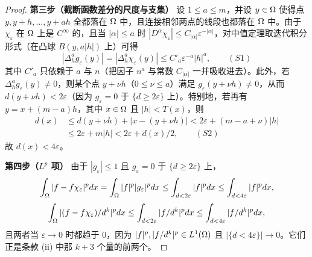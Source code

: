 \begin{proof}
\textbf{第三步（截断函数差分的尺度与支集）} 设 $1 \le a \le m$，并设 $y \in \Omega$ 使得点 $y, y+h, \dots, y+a h$ 全都落在 $\Omega$ 中，且连接相邻两点的线段也都落在 $\Omega$ 中。由于 $\chi_\varepsilon$ 在 $\Omega$ 上是 $C^\infty$ 的，且当 $|\alpha| \le a$ 时 $|D^\alpha \chi_\varepsilon| \le C_{|\alpha|} \varepsilon^{-|\alpha|}$，对中值定理取迭代积分形式（在凸球 $B(y,a|h|)$ 上）可得
\[
|\Delta_h^a g_\varepsilon(y)| = |\Delta_h^a \chi_\varepsilon(y)| \le C'_a \varepsilon^{-a} |h|^a, \qquad (S1)
\]
其中 $C'_a$ 只依赖于 $a$ 与 $n$（把因子 $n^a$ 与常数 $C_{|\alpha|}$ 一并吸收进去）。此外，若 $\Delta_h^a g_\varepsilon(y) \ne 0$，则某个点 $y + \nu h$（$0 \le \nu \le a$）满足 $g_\varepsilon(y+\nu h) \ne 0$，从而 $d(y+\nu h) < 2 \varepsilon$（因为 $g_\varepsilon = 0$ 于 $\{d \ge 2 \varepsilon\}$ 上）。特别地，若再有 $y = x+(m-a)h$，其中 $x \in \Omega$ 且 $|h| < T(x)$，则
\[
\begin{aligned}
d(x) &\le d(y+\nu h) + |x - (y+\nu h)| < 2 \varepsilon + (m-a+\nu)|h| \\
&\le 2 \varepsilon + m |h| < 2 \varepsilon + d(x)/2, \qquad (S2)
\end{aligned}
\]
故 $d(x) < 4 \varepsilon$。

\textbf{第四步（$L^p$ 项）} 由于 $|g_\varepsilon| \le 1$ 且 $g_\varepsilon = 0$ 于 $\{d \ge 2 \varepsilon\}$ 上，
\[
\int_\Omega |f - f \chi_\varepsilon|^p dx = \int_\Omega |f|^p |g_\varepsilon|^p dx \le \int_{d < 2 \varepsilon} |f|^p dx \le \int_{d<4\varepsilon} |f|^p dx,
\]
\[
\int_\Omega |(f - f \chi_\varepsilon)/d^k|^p dx \le \int_{d < 2 \varepsilon} |f/d^k|^p dx \le \int_{d<4\varepsilon} |f/d^k|^p dx,
\]
且两者当 $\varepsilon \to 0$ 时都趋于 $0$，因为 $|f|^p, |f/d^k|^p \in L^1(\Omega)$ 且 $|\{d < 4 \varepsilon\}| \to 0$。它们正是条款 (ii) 中那 $k+3$ 个量的前两个。


\end{proof}
